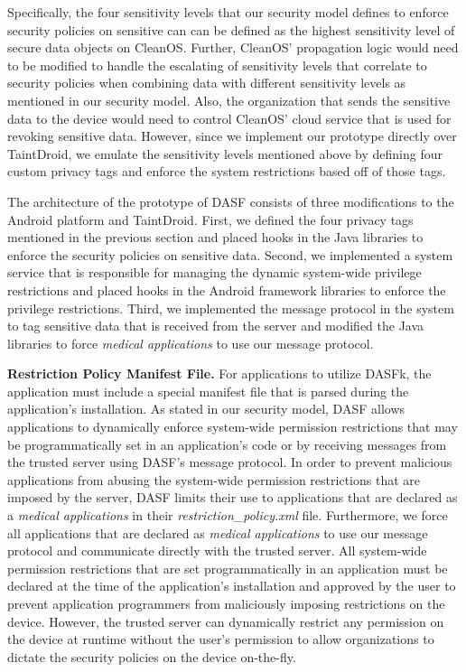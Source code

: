 Specifically, the four sensitivity levels that our security model defines to
enforce security policies on sensitive can can be defined as the
highest sensitivity level of secure data objects on CleanOS.  Further,
CleanOS' propagation logic would need to be modified to handle
the escalating of sensitivity levels that correlate to security policies
when combining data with different sensitivity levels as mentioned in
our security model.  Also, the organization that sends the sensitive
data to the device would need to control CleanOS' cloud service that is
used for revoking sensitive data.  However, since we implement our prototype
directly over TaintDroid, we emulate the sensitivity levels mentioned above
by defining four custom privacy tags and enforce the system restrictions based
off of those tags.

The architecture of the prototype of DASF consists
of three modifications to the Android platform and TaintDroid.  
First, we defined the four privacy tags mentioned in the previous section
and placed hooks in the Java libraries to enforce the security policies
on sensitive data.  Second, we implemented a system service that is
responsible for managing the dynamic system-wide privilege restrictions
and placed hooks in the Android framework libraries to enforce the privilege
restrictions.  Third, we implemented the message protocol in the system
to tag sensitive data that is received from the server and modified the
Java libraries to force \textit{medical applications} to use our message
protocol.

\textbf{Restriction Policy Manifest File.}  For applications to utilize
DASFk, the application must include a special manifest
file that is parsed during the application's installation.  As stated
in our security model, DASF allows applications to
dynamically enforce system-wide permission restrictions that may be
programmatically set in an application's code or by receiving messages
from the trusted server using DASF's message protocol. In order
to prevent malicious applications from abusing the system-wide permission
restrictions that are imposed by the server, DASF limits their
use to applications that are declared as a \textit{medical applications} in
their \textit{restriction\_policy.xml} file.  Furthermore, we
force all applications that are declared as \textit{medical applications}
to use our message protocol and communicate directly with the trusted
server.  All system-wide permission restrictions that are set
programmatically in an application must be declared at the time
of the application's installation and approved by the user to
prevent application programmers from maliciously imposing restrictions
on the device. However, the trusted server can dynamically restrict
any permission on the device at runtime without the user's permission
to allow organizations to dictate the security policies on the device
on-the-fly. 

